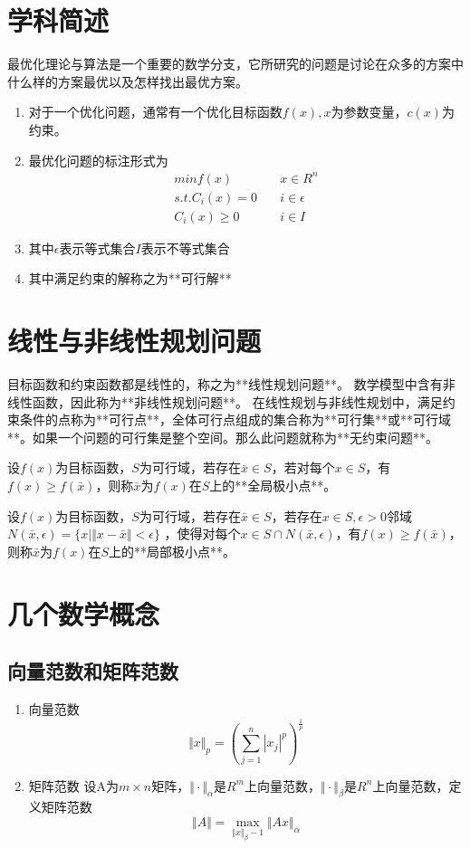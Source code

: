 \section{学科简述}
最优化理论与算法是一个重要的数学分支，它所研究的问题是讨论在众多的方案中什么样的方案最优以及怎样找出最优方案。
\begin{enumerate}
	\item 对于一个优化问题，通常有一个优化目标函数$f(x),x$为参数变量，$c(x)$为约束。
	\item 最优化问题的标注形式为
	\begin{equation}
	\begin{aligned}
		min f(x) &\quad x \in R^n \\
		s.t. C_i(x) = 0 &\quad i \in \epsilon \\
		C_i(x) \geq 0 &\quad i \in I
	\end{aligned}
	\end{equation}
	\item 其中$\epsilon$表示等式集合$I$表示不等式集合
	\item 其中满足约束的解称之为**可行解**
\end{enumerate}
\section{线性与非线性规划问题}
目标函数和约束函数都是线性的，称之为**线性规划问题**。
数学模型中含有非线性函数，因此称为**非线性规划问题**。
在线性规划与非线性规划中，满足约束条件的点称为**可行点**，全体可行点组成的集合称为**可行集**或**可行域**。如果一个问题的可行集是整个空间。那么此问题就称为**无约束问题**。

设$f(x)$为目标函数，$S$为可行域，若存在$\bar{x}\in S$，若对每个$x\in S$，有$f(x) \geq f(\bar{x})$，则称$\bar{x}$为$f(x)$在$S$上的**全局极小点**。

设$f(x)$为目标函数，$S$为可行域，若存在$\bar{x}\in S$，若存在$x\in S,\epsilon > 0$邻域$N(\bar{x},\epsilon) = \{x | \Vert x - \bar{x} \Vert < \epsilon \}$ ，使得对每个$x \in S \cap N(\bar{x},\epsilon)$，有$f(x) \geq f(\bar{x})$，则称$\bar{x}$为$f(x)$在$S$上的**局部极小点**。

\section{几个数学概念}
\subsection*{向量范数和矩阵范数}
\begin{enumerate}
	\item 向量范数
	\begin{equation}
		\Vert x \Vert _p = \left(\sum_{j=1}^n |x_j|^p \right)^{\frac{1}{p}}
	\end{equation}
	\item 矩阵范数 
	设A为$m \times n$矩阵，$\Vert \cdot\Vert_\alpha$是$R^m$上向量范数，$\Vert \cdot \Vert_\beta$是$R^n$上向量范数，定义矩阵范数
	\begin{equation}
		\Vert A \Vert = \max_{\Vert x \Vert _\beta -1}\Vert Ax\Vert _\alpha
	\end{equation}
\end{enumerate}
